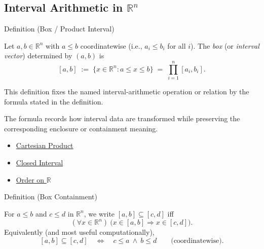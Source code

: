 
\subsection{\texorpdfstring{Interval Arithmetic in $\mathbb{R}^n$}{Interval Arithmetic in R n}}
\label{sec:interval-arithmetic-rn}

\begin{definitionbox}{Definition (Box / Product Interval)}
\begin{definition}\label{def:product-interval-box}
Let $a,b\in\mathbb{R}^n$ with $a\le b$ coordinatewise (i.e., $a_i\le b_i$ for all $i$).
The \emph{box} (or \emph{interval vector}) determined by $(a,b)$ is
\[
[a,b] \;:=\; \{x\in\mathbb{R}^n : a\le x \le b\}
\;=\;\prod_{i=1}^n [a_i,b_i].
\]
\end{definition}
\end{definitionbox}

\begin{remark*}
This definition fixes the named interval-arithmetic operation or relation by
the formula stated in the definition.
\end{remark*}

\begin{remark*}[Interpretation]
The formula records how interval data are transformed while preserving the
corresponding enclosure or containment meaning.
\end{remark*}

\begin{dependencies}
\begin{itemize}
  \item \hyperref[def:cartesian-product]{Cartesian Product}
  \item \hyperref[def:closed-interval]{Closed Interval}
  \item \hyperref[def:order-on-r]{Order on $\mathbb{R}$}
\end{itemize}
\end{dependencies}

\begin{definitionbox}{Definition (Box Containment)}
\begin{definition}\label{def:box-contain}
For $a\le b$ and $c\le d$ in $\mathbb{R}^n$, we write $[a,b]\subseteq[c,d]$ iff
\[
(\forall x\in\mathbb{R}^n)\ \bigl(x\in[a,b]\Rightarrow x\in[c,d]\bigr).
\]
Equivalently (and most useful computationally),
\[
[a,b]\subseteq[c,d]\quad \Longleftrightarrow\quad c\le a\ \land\ b\le d
\qquad\text{(coordinatewise).}
\]
\end{definition}
\end{definitionbox}

